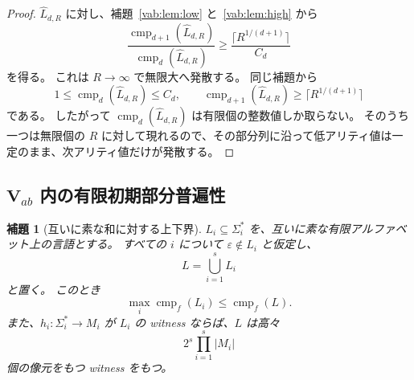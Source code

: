 \documentclass[10pt,a4paper]{ltjsarticle}
\newtheorem{lemma}[theorem]{補題}
\theoremstyle{definition}
\theoremstyle{remark}
\newcommand{\cmp}{\operatorname{cmp}}
\begin{document}
\begin{proof}
$\widehat L_{d,R}$ に対し、補題~\ref{vab:lem:low} と~\ref{vab:lem:high} から
\[
\frac{\cmp_{d+1}(\widehat L_{d,R})}
     {\cmp_d(\widehat L_{d,R})}
\ge
\frac{\lceil R^{1/(d+1)}\rceil}{C_d}
\]
を得る。
これは $R\to\infty$ で無限大へ発散する。
同じ補題から
\[
1\le\cmp_d(\widehat L_{d,R})\le C_d,
\qquad
\cmp_{d+1}(\widehat L_{d,R})
\ge\lceil R^{1/(d+1)}\rceil
\]
である。
したがって $\cmp_d(\widehat L_{d,R})$ は有限個の整数値しか取らない。
そのうち一つは無限個の $R$ に対して現れるので、その部分列に沿って低アリティ値は一定のまま、次アリティ値だけが発散する。
\end{proof}

\subsection{\texorpdfstring{$\mathbf V_{ab}$}{Vab} 内の有限初期部分普遍性}

\begin{lemma}[互いに素な和に対する上下界]
\label{vab:lem:union}
$L_i\subseteq\Sigma_i^*$ を、互いに素な有限アルファベット上の言語とする。
すべての $i$ について $\varepsilon\notin L_i$ と仮定し、
\[
L=\bigcup_{i=1}^sL_i
\]
と置く。
このとき
\[
\max_i\cmp_f(L_i)\le\cmp_f(L).
\]
また、$h_i:\Sigma_i^*\to M_i$ が $L_i$ の witness ならば、$L$ は高々
\[
2^s\prod_{i=1}^s|M_i|
\]
個の像元をもつ witness をもつ。
\end{lemma}
\end{document}
